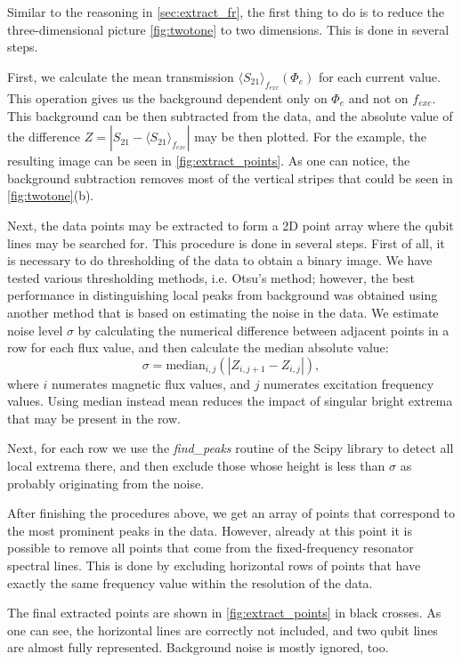 \documentclass[%
 aip,
 amsmath,amssymb,
 reprint,%
]{revtex4-1}
\begin{document}
Similar to the reasoning in \autoref{sec:extract_fr}, the first thing to do is to reduce the three-dimensional picture \autoref{fig:twotone} to two dimensions. This is done in several steps.

First, we calculate the mean transmission $\langle S_{21}\rangle_{f_{exc}} (\Phi_{e})$ for each current value. This operation gives us the background dependent only on $\Phi_e$ and not on  $ f_{exc} $. This background can be then subtracted from the data, and the absolute value of the difference $ Z = \left| S_{21} - \langle S_{21}\rangle_{f_{exc}} \right |$ may be then plotted. For the example, the resulting image can be seen in \autoref{fig:extract_points}. As one can notice, the background subtraction removes most of the vertical stripes that could be seen in \autoref{fig:twotone}(b).

Next, the data points may be extracted to form a 2D point array where the qubit lines may be searched for. This procedure is done in several steps. First of all, it is necessary to do thresholding of the data to obtain a binary image. We have tested various thresholding methods, i.e. Otsu's method\cite{otsu1979}; however, the best performance in distinguishing local peaks from background was obtained using another method that is based on estimating the noise in the data. We estimate noise level $\sigma$ by calculating the numerical difference between adjacent points in a row for each flux value, and then calculate the median absolute value: 
\[
\sigma = \text{median}_{i,j}\left( \left| Z_{i,j+1} - Z_{i,j} \right| \right),
\]
where $i$ numerates magnetic flux values, and $j$ numerates excitation frequency values. Using median instead mean reduces the impact of singular bright extrema that may be present in the row.

Next, for each row we use the \textit{find\_peaks} routine of the Scipy library to detect all local extrema there, and then exclude those whose height is less than $\sigma$ as probably originating from the noise.

After finishing the procedures above, we get an array of points that correspond to the most prominent peaks in the data. However, already at this point it is possible to remove all points that come from the fixed-frequency resonator spectral lines. This is done by excluding horizontal rows of points that have exactly the same frequency value within the resolution of the data.

The final extracted points are shown in \autoref{fig:extract_points} in black crosses. As one can see, the horizontal lines are correctly not included, and two qubit lines are almost fully represented. Background noise is mostly ignored, too.
\end{document}

